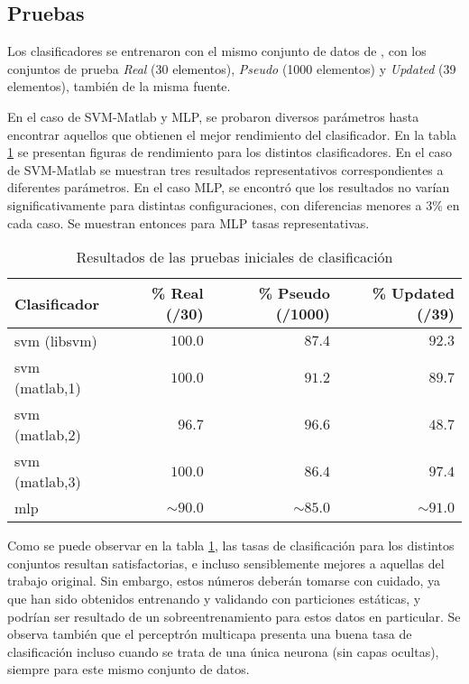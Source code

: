 \documentclass[12pt,bibliography=oldstyle,DIV=12,parskip=half-]{scrartcl}
\begin{document}
\subsection{Pruebas}
Los clasificadores se entrenaron con el mismo conjunto de datos
de \cite{xue}, con los conjuntos de prueba \emph{Real} (30 elementos),
\emph{Pseudo} (1000 elementos) y \emph{Updated} (39 elementos), también
de la misma fuente.

En el caso de SVM-Matlab y MLP, se probaron diversos parámetros hasta
encontrar aquellos que obtienen el mejor rendimiento del clasificador.
En la tabla \ref{testresults} se presentan figuras de rendimiento para
los distintos clasificadores. En el caso de SVM-Matlab se muestran
tres resultados representativos correspondientes a diferentes
parámetros.  En el caso MLP, se encontró que los resultados no varían
significativamente para distintas configuraciones, con diferencias
menores a 3\% en cada caso.  Se muestran entonces para MLP tasas
representativas.
%
\begin{table}
  \caption{Resultados de las pruebas iniciales de clasificación}
  \center%
  \begin{tabular}{lrrr}
    Clasificador   & \% Real (/30) &
                     \% Pseudo (/1000) & \% Updated (/39) \\\hline
    svm (libsvm)   & $100.0$    & $87.4$     & $92.3$     \\
    svm (matlab,1) & $100.0$    & $91.2$     & $89.7$     \\
    svm (matlab,2) & $96.7$     & $96.6$     & $48.7$     \\
    svm (matlab,3) & $100.0$    & $86.4$     & $97.4$     \\
    mlp            & $\sim90.0$ & $\sim85.0$ & $\sim91.0$  
  \end{tabular}
  \label{testresults}
\end{table}
%

Como se puede observar en la tabla \ref{testresults}, las tasas de
clasificación para los distintos conjuntos resultan satisfactorias, e
incluso sensiblemente mejores a aquellas del trabajo original.  Sin
embargo, estos números deberán tomarse con cuidado, ya que han sido
obtenidos entrenando y validando con particiones estáticas, y podrían
ser resultado de un sobreentrenamiento para estos datos en
particular. Se observa también que el perceptrón multicapa presenta
una buena tasa de clasificación incluso cuando se trata de una única
neurona (sin capas ocultas), siempre para este mismo conjunto de
datos.
\end{document}
